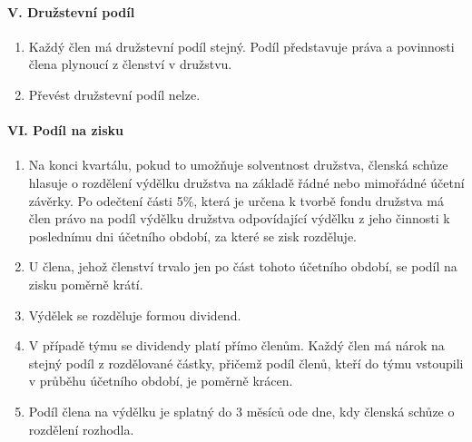 \paragraph{V. Družstevní podíl}
\begin{enumerate}
    \item Každý člen má družstevní podíl stejný. Podíl představuje práva a povinnosti člena plynoucí z členství v družstvu.
    \item Převést družstevní podíl nelze.
\end{enumerate}

\paragraph{VI. Podíl na zisku}
\begin{enumerate}
    \item Na konci kvartálu, pokud to umožňuje solventnost družstva, členská schůze hlasuje o rozdělení výdělku družstva na základě řádné nebo mimořádné účetní závěrky. Po odečtení části 5\%, která je určena k tvorbě fondu družstva má člen právo na podíl výdělku družstva odpovídající výdělku z jeho činnosti k poslednímu dni účetního období, za které se zisk rozděluje.
    \item U člena, jehož členství trvalo jen po část tohoto účetního období, se podíl na zisku poměrně krátí.
    \item Výdělek se rozděluje formou dividend. 
    \item V případě týmu se dividendy platí přímo členům. Každý člen má nárok na stejný podíl z rozdělované částky, přičemž podíl členů, kteří do týmu vstoupili v průběhu účetního období, je poměrně krácen.
    \item Podíl člena na výdělku je splatný do 3 měsíců ode dne, kdy členská schůze o rozdělení rozhodla.
\end{enumerate}

